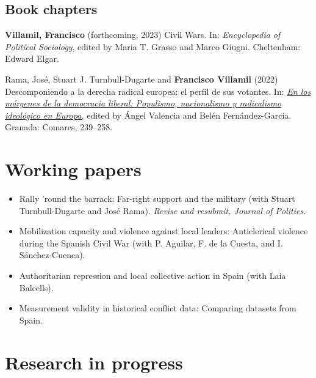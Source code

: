 \documentclass[a4paper, 12pt]{article}
\begin{document}
\subsection*{Book chapters}

\begin{etaremune}[leftmargin=12pt, itemsep=0pt]
\item \textbf{Villamil, Francisco} (forthcoming, 2023) Civil Wars. In: \textit{Encyclopedia of Political Sociology}, edited by Maria T. Grasso and Marco Giugni. Cheltenham: Edward Elgar.
\item Rama, José, Stuart J. Turnbull-Dugarte and \textbf{Francisco Villamil} (2022) Descomponiendo a la derecha radical europea: el perfil de sus votantes. In: \href{https://www.comares.com/libro/en-los-margenes-de-la-democracia-liberal_143816/}{\textit{En los márgenes de la democracia liberal: Populismo, nacionalismo y radicalismo ideológico en Europa,}} edited by Ángel Valencia and Belén Fernández-García. Granada: Comares, 239--258.
\end{etaremune}



\section*{Working papers}

\begin{itemize}[leftmargin=*, nolistsep]
\item Rally 'round the barrack: Far-right support and the military (with Stuart Turnbull-Dugarte and José Rama). \textit{Revise and resubmit, Journal of Politics.}
\item Mobilization capacity and violence against local leaders: Anticlerical violence during the Spanish Civil War (with P. Aguilar, F. de la Cuesta, and I. Sánchez-Cuenca).
\item Authoritarian repression and local collective action in Spain (with Laia Balcells).
\item Measurement validity in historical conflict data: Comparing datasets from Spain.
\end{itemize}

\section*{Research in progress}
\end{document}
